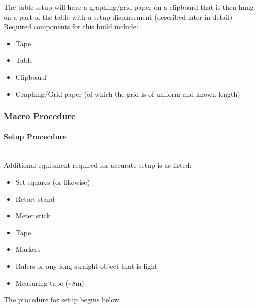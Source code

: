 \documentclass[12pt]{article}
\begin{document}
The table setup will have a graphing/grid paper on a clipboard that is then hung on a part of the table with a setup displacement (described later in detail) Required components for this build include: %
\begin{itemize}
    \item Tape
    \item Table
    \item Clipboard
    \item Graphing/Grid paper (of which the grid is of uniform and known length)
\end{itemize}



\subsubsection{Macro Procedure}

\paragraph{Setup Procecdure}\leavevmode\\

Additional equipment required for accurate setup is as listed: %
\begin{itemize}
    \item Set squares (or likewise)
    \item Retort stand
    \item Meter stick
    \item Tape %
    \item Markers %
    \item Rulers or any long straight object that is light
    \item Measuring tape (\textasciitilde 8m)
\end{itemize}

The procedure for setup begins below
\end{document}
